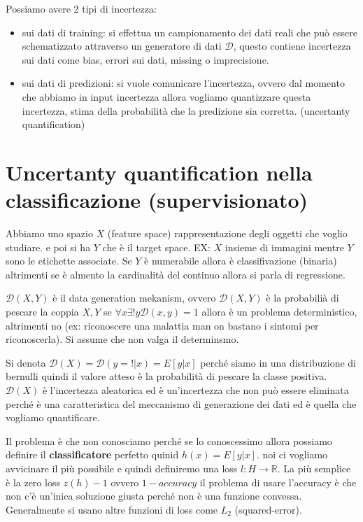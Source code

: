Possiamo avere 2 tipi di incertezza:
\begin{itemize}
    \item sui dati di training: si effettua un campionamento dei dati reali che può essere schematizzato attraverso un 
    generatore di dati $\mathcal{D}$, questo contiene incertezza sui dati come bias, errori sui dati, missing o imprecisione.
    \item sui dati di predizioni: si vuole comunicare l'incertezza, ovvero dal momento che abbiamo in input incertezza allora vogliamo 
    quantizzare questa incertezza, stima della probabilità che la predizione sia corretta. (uncertanty quantification)
\end{itemize}

\section*{Uncertanty quantification nella classificazione (supervisionato)}

Abbiamo uno spazio $X$ (feature space) rappresentazione degli oggetti che voglio studiare. e poi si ha $Y$ che è il target space. EX:
$X$ insieme di immagini mentre $Y$ sono le etichette associate. Se $Y$ è numerabile allora è classifivazione (binaria) altrimenti se è almento la 
cardinalità del continuo allora si parla di regressione.

$\mathcal{D}(X, Y)$ è il data generation mekanism, ovvero $\mathcal{D}(X, Y)$ è la probabilià di pescare la coppia $X,Y$ se $\forall x \exists !y\mathcal{D}(x,y)=1$
allora è un problema deterministico, altrimenti no (ex: riconoscere una malattia man on bastano i sintomi per riconoscerla). Si assume 
che non valga il determinsmo.

Si denota $\mathcal{D}(X)=\mathcal{D}(y=!|x) = E[y|x]$ perché siamo in una distribuzione di bernulli quindi il valore atteso è la probabilità 
di pescare la classe positiva. $\mathcal{D}(X)$ è l'incertezza aleatorica ed è un'incertezza che non può essere eliminata perché è una caratteristica
del meccanismo di generazione dei dati ed è quella che vogliamo quantificare. 

Il problema è che non conosciamo perché se lo conoscessimo allora possiamo definire il \textbf{classificatore}
perfetto quinid $h(x)=E[y|x]$. noi ci vogliamo avvicinare il più possibile e quindi definiremo una loss $l:H\to \mathbb{R}$.
La più semplice è la zero loss  $z(h)-1$ ovvero $1-accuracy$ il problema di usare l'accuracy è che non c'è un'inica soluzione giusta 
perché non è una funzione convessa. Generalmente si usano altre funzioni di loss come $L_2$ (squared-error).

